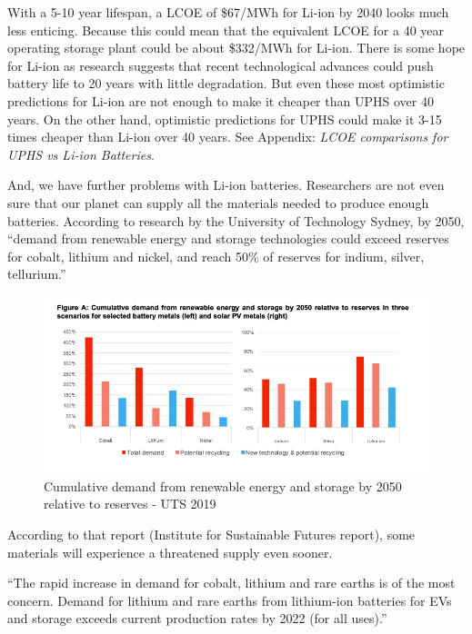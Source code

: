 \documentclass[hidelinks,12pt,a4paper]{article}
\begin{document}
With a 5-10 year lifespan, a LCOE of \$67/MWh for Li-ion by 2040 looks much less enticing. Because this could mean that the equivalent LCOE for a 40 year operating storage plant could be about \$332/MWh for Li-ion. There is some hope for Li-ion as research suggests that recent technological advances could push battery life to 20 years with little degradation. But even these most optimistic predictions for Li-ion are not enough to make it cheaper than UPHS over 40 years. On the other hand, optimistic predictions for UPHS could make it 3-15 times cheaper than Li-ion over 40 years. See Appendix: \textit{LCOE comparisons for UPHS vs Li-ion Batteries}.

And, we have further problems with Li-ion batteries. Researchers are not even sure that our planet can supply all the materials needed to produce enough batteries. According to research by the University of Technology Sydney, by 2050, “demand from renewable energy and storage technologies could exceed reserves for cobalt, lithium and nickel, and reach 50\% of reserves for indium, silver, tellurium.”

\begin{figure}[ht!]
    \centering
    \includegraphics[width=1\textwidth]{chemical-battery-reserves-for-2050.png}
    \caption{Cumulative demand from renewable energy and storage by 2050 relative to reserves -  UTS 2019 \cite{ResponsibleMineralsSourcingForRenewableEnergy}}
\end{figure}
\FloatBarrier

According to that report (Institute for Sustainable Futures report), some materials will experience a threatened supply even sooner.

\begin{displayquote}
“The rapid increase in demand for cobalt, lithium and rare earths is of the most concern. Demand for lithium and rare earths from lithium-ion batteries for EVs and storage exceeds current production rates by 2022 (for all uses).” \cite{ResponsibleMineralsSourcingForRenewableEnergy}
\end{displayquote}
\end{document}

